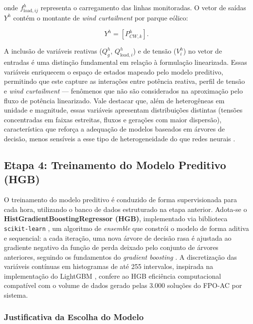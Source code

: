 \documentclass[conference]{IEEEtran}
\begin{document}
\noindent onde $f_{\text{load},ij}^{h}$ representa o carregamento das
linhas monitoradas. O vetor de saídas $Y^h$ contém o montante de
\textit{wind curtailment} por parque eólico:

\begin{equation}
Y^{h} = \left[ P_{CW,k}^{h} \right].
\label{eq:Yh}
\end{equation}

A inclusão de variáveis reativas ($Q_g^h$, $Q_{\text{load},i}^h$) e de
tensão ($V_i^h$) no vetor de entradas é uma distinção fundamental em
relação à formulação linearizada. Essas variáveis enriquecem o espaço de
estados mapeado pelo modelo preditivo, permitindo que este capture as interações
entre potência reativa, perfil de tensão e \textit{wind curtailment} —
fenômenos que não são considerados na aproximação pelo fluxo de potência linearizado.
Vale destacar que, além de heterogêneas em unidade e magnitude, essas
variáveis apresentam distribuições distintas (tensões concentradas em
faixas estreitas, fluxos e gerações com maior dispersão), característica
que reforça a adequação de modelos baseados em árvores de decisão, menos
sensíveis a esse tipo de heterogeneidade do que redes neurais \cite{grinsztajn2022tree}.

\subsection{Etapa 4: Treinamento do Modelo Preditivo (HGB)}
\label{sec:etapa4}

O treinamento do modelo preditivo é conduzido de forma supervisionada para
cada hora, utilizando o banco de dados estruturado na etapa anterior.
Adota-se o \textbf{HistGradientBoostingRegressor (HGB)}, implementado via
biblioteca \texttt{scikit-learn} \cite{pedregosa2011scikit}, um algoritmo de
\textit{ensemble} que constrói o modelo de forma aditiva e sequencial: a
cada iteração, uma nova árvore de decisão rasa é ajustada ao gradiente
negativo da função de perda deixado pelo conjunto de árvores anteriores,
seguindo os fundamentos do \textit{gradient boosting} \cite{friedman2001greedy}.
A discretização das variáveis contínuas em histogramas de até 255
intervalos, inspirada na implementação do LightGBM \cite{ke2017lightgbm},
confere ao HGB eficiência computacional compatível com o volume de dados
gerado pelas 3.000 soluções do FPO-AC por sistema.

\subsubsection{Justificativa da Escolha do Modelo}
\end{document}
